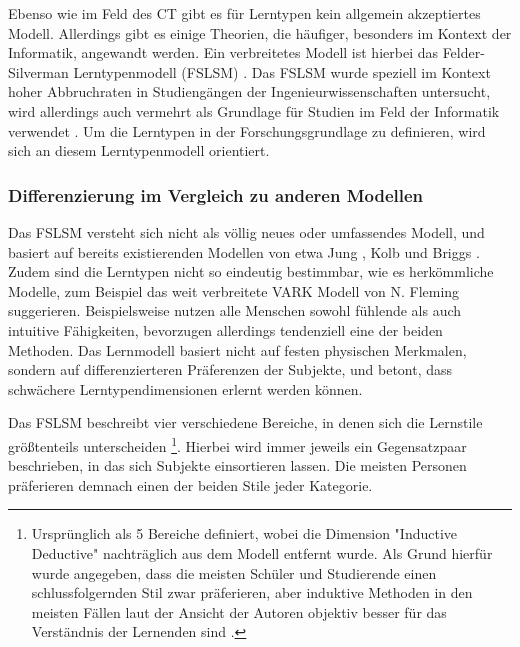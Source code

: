 Ebenso wie im Feld des CT gibt es für Lerntypen kein allgemein akzeptiertes Modell. Allerdings gibt es einige Theorien, die häufiger, besonders im Kontext der Informatik, angewandt werden. Ein verbreitetes Modell ist hierbei das Felder-Silverman Lerntypenmodell (FSLSM) \cite{felder}. 
Das FSLSM wurde speziell im Kontext hoher Abbruchraten in Studiengängen der Ingenieurwissenschaften untersucht, wird allerdings auch vermehrt als Grundlage für Studien im Feld der Informatik verwendet \cite{kumar}.
Um die Lerntypen in der Forschungsgrundlage zu definieren, wird sich an diesem Lerntypenmodell orientiert.

\subsubsection{Differenzierung im Vergleich zu anderen Modellen}
Das FSLSM versteht sich nicht als völlig neues oder umfassendes Modell, und basiert auf bereits existierenden Modellen von etwa Jung \cite{jung}, Kolb \cite{kolb} und Briggs \cite{myers}.
Zudem sind die Lerntypen nicht so eindeutig bestimmbar, wie es herkömmliche Modelle, zum Beispiel das weit verbreitete VARK Modell von N. Fleming suggerieren.
Beispielsweise nutzen alle Menschen sowohl fühlende als auch intuitive Fähigkeiten, bevorzugen allerdings tendenziell eine der beiden Methoden. Das Lernmodell basiert nicht auf festen physischen Merkmalen, sondern auf differenzierteren Präferenzen der Subjekte, und betont, dass schwächere Lerntypendimensionen erlernt werden können.

Das FSLSM beschreibt vier verschiedene Bereiche, in denen sich die Lernstile größtenteils unterscheiden \footnote{Ursprünglich als 5 Bereiche definiert, wobei die Dimension "Inductive Deductive" nachträglich aus dem Modell entfernt wurde. Als Grund hierfür wurde angegeben, dass die meisten Schüler und Studierende einen schlussfolgernden Stil zwar präferieren, aber induktive Methoden in den meisten Fällen laut der Ansicht der Autoren objektiv besser für das Verständnis der Lernenden sind \cite{felder}.}. Hierbei wird immer jeweils ein Gegensatzpaar beschrieben, in das sich Subjekte einsortieren lassen. Die meisten Personen präferieren demnach einen der beiden Stile jeder Kategorie.

